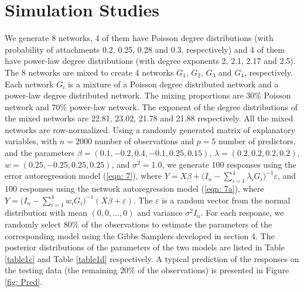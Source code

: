 \documentclass[times, doublespace]{auth}
\begin{document}
\section{Simulation Studies}
We generate 8 networks, 4 of them have Poisson degree distributions (with probability of attachments 0.2, 0.25, 0.28 and 0.3, respectively) and 4 of them have power-law degree distributions (with degree exponents 2, 2.1, 2.17 and 2.5). The 8 networks are mixed to create 4 networks $G_{1}$, $G_{2}$, $G_{3}$ and $G_{4}$, respectively. Each network $G_{i}$ is a mixture of a Poisson degree distributed network and a power-law degree distributed network. The mixing proportions are $30\%$ Poisson network and $70\%$ power-law network. The exponent of the degree distributions of the mixed networks are 22.81, 23.02, 21.78 and 21.88 respectively. All the mixed networks are row-normalized. Using a randomly generated matrix of explanatory variables, with $n=2000$ number of observations and $p=5$ number of predictors, and the parameters $\beta = (0.1,-0.2,0.4,-0.1,0.25,0.15)$, $\lambda = (0.2,0.2,0.2,0.2)$, $w = (0.25,-0.25,0.25,0.25)$, and $\sigma^{2}=1.0$,  we generate 100 responses using the error autoregression model (\ref{eqn: 7}), where $Y = X\beta + \bigg(I_{n}-\sum\limits_{i=1}^{4}\lambda_{i}G_{i}\bigg)^{-1}\varepsilon$, and 100 responses using the network autoregression model (\ref{eqn: 7a}), where $Y = \bigg(I_{n}-\sum\limits_{i=1}^{4}w_{i}G_{i}\bigg)^{-1}(X\beta + \varepsilon)$. The $\varepsilon$ is a random vector from the normal distribution with mean $(0,0,\ldots,0)$ and variance $\sigma^{2}I_{n}$. For each response, we randomly select $80\%$ of the observations to estimate the parameters of the corresponding model using the Gibbs Samplers developed in section 4. The posterior distributions of the parameters of the two models are listed in Table \ref{table1c} and Table \ref{table1d} respectively. A typical prediction of the responses on the testing data (the remaining $20\%$ of the observations) is presented in Figure \ref{fig: Pred}.
\end{document}
